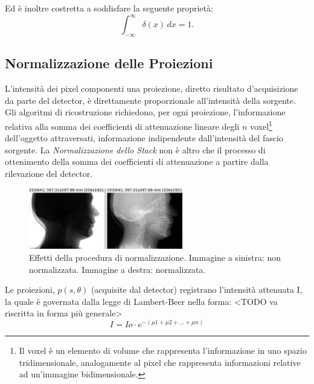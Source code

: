 \documentclass[a4paper,12pt, doubleside]{report}
\begin{document}
                    Ed è inoltre costretta a soddisfare la seguente proprietà:
                    \begin{equation}
                        \int_{-\infty}^\infty \delta(x) \, dx = 1.
                    \end{equation}
            
            \subsection{Normalizzazione delle Proiezioni}
                \label{sec:normalizzazione}
                \par
                    L'intensità dei pixel componenti una proiezione, diretto risultato d'acquisizione da parte del detector, è direttamente proporzionale all'intensità della sorgente. Gli algoritmi di ricostruzione richiedono, per ogni proiezione, l'informazione relativa alla somma dei coefficienti di attenuazione lineare degli $n$ voxel\footnote{Il voxel è un elemento di volume che rappresenta l'informazione in uno spazio tridimensionale, analogamente al pixel che rappresenta informazioni relative ad un'immagine bidimensionale.} dell'oggetto attraversati, informazione indipendente dall'intensità del fascio sorgente. La \textit{Normalizzazione dello Stack} non è altro che il processo di ottenimento della somma dei coefficienti di attenuazione a partire dalla rilevazione del detector.
              
                    \begin{figure}[h]
                        \centering
                        \includegraphics[width=0.6\textwidth]{normalization}
                        \caption{Effetti della procedura di normalizzazione. Immagine a sinistra: non normalizzata. Immagine a destra: normalizzata.}
                        \label{fig:skull-phantom}
                    \end{figure}
                    
                    Le proiezioni, $p(s,\theta)$ (acquisite dal detector) registrano l'intensità attenuata I, la quale è governata dalla legge di Lambert-Beer \cite{lambert-beer} nella forma:
                    <TODO va riscritta in forma più generale>
                    \begin{equation} \label{eq:lambert-beer}
                        I = Io \cdot e^{- (\mu1 + \mu2 + ...  + \mu n)}
                    \end{equation}
                    
\end{document}
